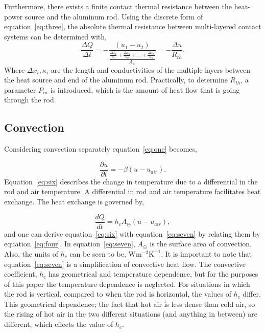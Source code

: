 \documentclass[10pt,aps,prb,twocolumn, nofootinbib]{revtex4-1}
\newcommand{\ut}{\ensuremath{\frac{\partial u}{\partial t}}}
\newcommand{\Qt}{\ensuremath{\frac{dQ}{dt}} }
\begin{document}
Furthermore, there exists a finite contact thermal resistance between the heat-power source and the aluminum rod. Using the discrete form of equation~\ref{eq:three}, the absolute thermal resistance between multi-layered contact systems can be determined with,
\begin{equation}
\label{eq:five}
\frac{\Delta Q}{\Delta t} = -\frac{(u_1 - u_2)}{\frac{\frac{\Delta x_1}{\kappa_1} + \frac{\Delta x_2}{\kappa_2} + \dots + \frac{\Delta x_n}{\kappa_n}}{A_{\times}}} = -\frac{\Delta u}{R_{th}}.
\end{equation}
Where $\Delta x_i, \kappa_i$ are the length and conductivities of the multiple layers between the heat source and end of the aluminum rod. Practically, to determine $R_{th}$, a parameter $P_{in}$ is introduced, which is the amount of heat flow that is going through the rod. 
 

\subsection{\label{sec:oneConv}Convection}
Considering convection separately equation~\ref{eq:one} becomes,

\begin{equation}
\label{eq:six}
\ut = -\beta(u-u_{air}).
\end{equation}
Equation~\ref{eq:six} describes the change in temperature due to a differential in the rod and air temperature. A differential in rod and air temperature facilitates heat exchange. The heat exchange is governed by,

\begin{equation}
\label{eq:seven}
\Qt = h_cA_{\circleddash}(u-u_{air}),
\end{equation}
and one can derive  equation~\ref{eq:six} with equation~\ref{eq:seven} by relating them by equation~\ref{eq:four}.  
In equation~\ref{eq:seven}, $A_{\circleddash}$ is the surface area of convection. Also, the units of $h_c$ can be seen to be, $\text{W}\text{m}^{-2}\text{K}^{-1}$. It is important to note that equation~\ref{eq:seven} is a simplification of convective heat flow. The convective coefficient, $h_c$ has geometrical and temperature dependence, but for the purposes of this paper the temperature dependence is neglected. For situations in which the rod is vertical, compared to when the rod is horizontal, the values of $h_c$ differ. This geometrical dependence; the fact that hot air is less dense than cold air, so the rising of hot air in the two different situations (and anything in between) are different, which effects the value of $h_c$. 
\end{document}
